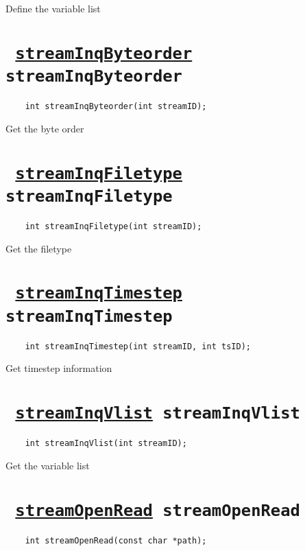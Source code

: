 Define the variable list
\ifpdfoutput{}{(\ref{streamDefVlist})}


\section*{\texttt{ 
\ifpdf
\hyperref[streamInqByteorder]{streamInqByteorder}
\else
streamInqByteorder
\fi
}}
\begin{verbatim}
    int streamInqByteorder(int streamID);
\end{verbatim}

Get the byte order
\ifpdfoutput{}{(\ref{streamInqByteorder})}


\section*{\texttt{ 
\ifpdf
\hyperref[streamInqFiletype]{streamInqFiletype}
\else
streamInqFiletype
\fi
}}
\begin{verbatim}
    int streamInqFiletype(int streamID);
\end{verbatim}

Get the filetype
\ifpdfoutput{}{(\ref{streamInqFiletype})}


\section*{\texttt{ 
\ifpdf
\hyperref[streamInqTimestep]{streamInqTimestep}
\else
streamInqTimestep
\fi
}}
\begin{verbatim}
    int streamInqTimestep(int streamID, int tsID);
\end{verbatim}

Get timestep information
\ifpdfoutput{}{(\ref{streamInqTimestep})}


\section*{\texttt{ 
\ifpdf
\hyperref[streamInqVlist]{streamInqVlist}
\else
streamInqVlist
\fi
}}
\begin{verbatim}
    int streamInqVlist(int streamID);
\end{verbatim}

Get the variable list
\ifpdfoutput{}{(\ref{streamInqVlist})}


\section*{\texttt{ 
\ifpdf
\hyperref[streamOpenRead]{streamOpenRead}
\else
streamOpenRead
\fi
}}
\begin{verbatim}
    int streamOpenRead(const char *path);
\end{verbatim}

